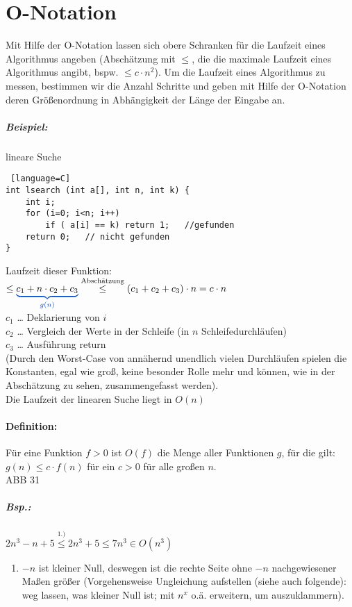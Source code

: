 \section{O-Notation}
Mit Hilfe der O-Notation lassen sich obere Schranken für die Laufzeit eines Algorithmus angeben (Abschätzung mit $\leq$, die die maximale Laufzeit eines Algorithmus angibt, bspw. $\leq c \cdot n^2$). Um die Laufzeit eines Algorithmus zu messen, bestimmen wir die Anzahl Schritte und geben mit Hilfe der O-Notation deren Größenordnung in Abhängigkeit der Länge der Eingabe an.

\subparagraph{Beispiel:} lineare Suche
\begin{lstlisting} [language=C]
int lsearch (int a[], int n, int k) {
	int i;
	for (i=0; i<n; i++)
		if ( a[i] == k) return 1;	//gefunden
	return 0;	// nicht gefunden
}
\end{lstlisting}
Laufzeit dieser Funktion:\\
$\leq \textcolor{blue}{\underbrace{\textcolor{black}{c_1+ n\cdot c_2+c_3}}_{g(n)}} \overset{\text{Abschätzung}}{\leq}(c_1+c_2+c_3)\cdot n= c \cdot n$\\
$c_1$ … Deklarierung von $i$\\
$c_2$ … Vergleich der Werte in der Schleife (in $n$ Schleifedurchläufen)\\
$c_3$ … Ausführung return\\
(Durch den Worst-Case von annähernd unendlich vielen Durchläufen spielen die Konstanten, egal wie groß, keine besonder Rolle mehr und können, wie in der Abschätzung zu sehen, zusammengefasst werden).\\
Die Laufzeit der linearen Suche liegt in $O(n)$

\paragraph{Definition:} Für eine Funktion $f>0$ ist $O(f)$ die Menge aller Funktionen $g$, für die gilt:\\
$g(n)\leq c\cdot f(n)$ für ein $c>0$ für alle großen $n$.\\
ABB 31

\subparagraph{Bsp.:} $2n^3-n+5\overset{1.)}{\leq} 2n^3+5 \leq 7n^3 \in O(n^3)$
\begin{enumerate}
\item $-n$ ist kleiner Null, deswegen ist die rechte Seite ohne $-n$ nachgewiesener Maßen größer (Vorgehensweise Ungleichung aufstellen (siehe auch folgende): weg lassen, was kleiner Null ist; mit $n^x$ o.ä. erweitern, um auszuklammern).
\end{enumerate}

